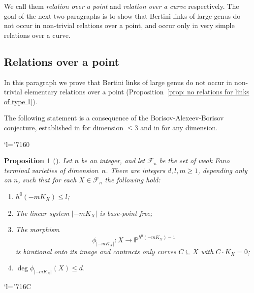\documentclass[JEP,XML,SOM,Unicode,NoFloatCountersInSection]{cedram}
\newcommand{\Changel}{\mathcode`l="7160}
\newcommand{\Changelback}{\mathcode`l="716C}
\theoremstyle{plain}
\newtheorem{prop}[thm]{Proposition}
\theoremstyle{definition}
\newcommand{\PP}{\mathbb P}
\begin{document}
We call them \emph{relation over a point} and \emph{relation over a curve} respectively. The goal of the next two paragraphs is to show that Bertini links of large genus do not occur in non-trivial relations over a point, and occur only in very simple relations over a curve.

\subsection{Relations over a point}

In this paragraph we prove that Bertini links of large genus do not occur in non-trivial elementary relations over a point (Proposition~\ref{prop: no relations for links of type 1}).

The following statement is a consequence of the Borisov-Alexeev-Borisov conjecture, established in \cite{KMMT,Kawamata} for dimension $\leqslant 3$ and in \cite{BirkarS} for any dimension.

\Changel
\begin{prop}[{\cite[Prop.\,5.1]{BLZ}}]\label{prop: BAB}
Let $n$ be an integer, and let $\mathcal{F}_n$ be the set of weak Fano terminal varieties of dimension~$n$. There are integers $d,l,m\ge 1$, depending only on $n$, such that for each $X \in \mathcal{F}_n$ the following hold:
\begin{enumerate}
\item
$h^0(-mK_X)\le l$;
\item
The linear system $\lvert -mK_X \rvert$ is base-point free;
\item
The morphism
\[
\phi_{|-mK_X|}\colon X\to \PP^{h^0(-mK_X)-1}
\]
is birational onto its image and contracts only curves $C\subseteq X$ with $C\cdot K_X=0$;
\item
$\deg \phi_{|-mK_X|}(X) \le d$.
\end{enumerate}
\end{prop}
\Changelback
\end{document}

